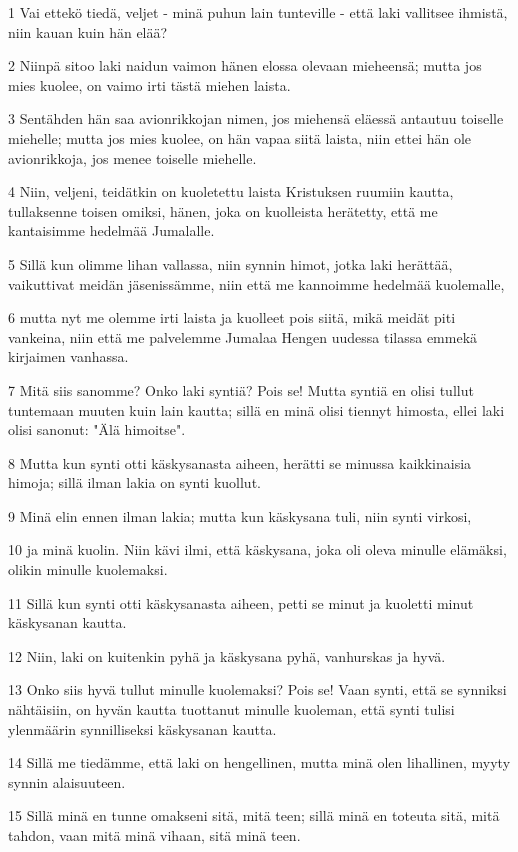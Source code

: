 \par 1 Vai ettekö tiedä, veljet - minä puhun lain tunteville - että laki vallitsee ihmistä, niin kauan kuin hän elää?
\par 2 Niinpä sitoo laki naidun vaimon hänen elossa olevaan mieheensä; mutta jos mies kuolee, on vaimo irti tästä miehen laista.
\par 3 Sentähden hän saa avionrikkojan nimen, jos miehensä eläessä antautuu toiselle miehelle; mutta jos mies kuolee, on hän vapaa siitä laista, niin ettei hän ole avionrikkoja, jos menee toiselle miehelle.
\par 4 Niin, veljeni, teidätkin on kuoletettu laista Kristuksen ruumiin kautta, tullaksenne toisen omiksi, hänen, joka on kuolleista herätetty, että me kantaisimme hedelmää Jumalalle.
\par 5 Sillä kun olimme lihan vallassa, niin synnin himot, jotka laki herättää, vaikuttivat meidän jäsenissämme, niin että me kannoimme hedelmää kuolemalle,
\par 6 mutta nyt me olemme irti laista ja kuolleet pois siitä, mikä meidät piti vankeina, niin että me palvelemme Jumalaa Hengen uudessa tilassa emmekä kirjaimen vanhassa.
\par 7 Mitä siis sanomme? Onko laki syntiä? Pois se! Mutta syntiä en olisi tullut tuntemaan muuten kuin lain kautta; sillä en minä olisi tiennyt himosta, ellei laki olisi sanonut: "Älä himoitse".
\par 8 Mutta kun synti otti käskysanasta aiheen, herätti se minussa kaikkinaisia himoja; sillä ilman lakia on synti kuollut.
\par 9 Minä elin ennen ilman lakia; mutta kun käskysana tuli, niin synti virkosi,
\par 10 ja minä kuolin. Niin kävi ilmi, että käskysana, joka oli oleva minulle elämäksi, olikin minulle kuolemaksi.
\par 11 Sillä kun synti otti käskysanasta aiheen, petti se minut ja kuoletti minut käskysanan kautta.
\par 12 Niin, laki on kuitenkin pyhä ja käskysana pyhä, vanhurskas ja hyvä.
\par 13 Onko siis hyvä tullut minulle kuolemaksi? Pois se! Vaan synti, että se synniksi nähtäisiin, on hyvän kautta tuottanut minulle kuoleman, että synti tulisi ylenmäärin synnilliseksi käskysanan kautta.
\par 14 Sillä me tiedämme, että laki on hengellinen, mutta minä olen lihallinen, myyty synnin alaisuuteen.
\par 15 Sillä minä en tunne omakseni sitä, mitä teen; sillä minä en toteuta sitä, mitä tahdon, vaan mitä minä vihaan, sitä minä teen.
